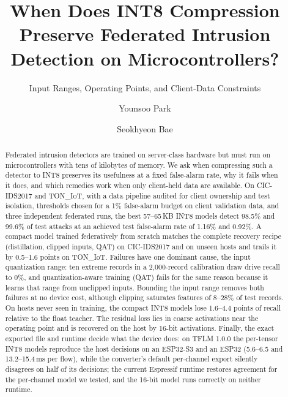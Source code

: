 \documentclass[sigplan,10pt,review,anonymous,nonacm]{acmart}
\newcommand{\cic}{CIC-IDS2017\xspace}
\newcommand{\ton}{TON\_IoT\xspace}
\begin{document}
\title[When Does INT8 Compression Preserve Federated IDS?]{When Does INT8 Compression Preserve Federated Intrusion Detection on Microcontrollers?}
\subtitle{Input Ranges, Operating Points, and Client-Data Constraints}

\author{Younsoo Park}
\author{Seokhyeon Bae}

\begin{abstract}
Federated intrusion detectors are trained on server-class hardware but must run on microcontrollers
with tens of kilobytes of memory. We ask when compressing such a detector to INT8 preserves its
usefulness at a fixed false-alarm rate, why it fails when it does, and which remedies work when only
client-held data are available. On \cic and \ton, with a data pipeline audited for client ownership
and test isolation, thresholds chosen for a 1\% false-alarm budget on client validation data, and
three independent federated runs, the best 57--65\,KB INT8 models detect 98.5\% and 99.6\% of test
attacks at an achieved test false-alarm rate of 1.16\% and 0.92\%. A compact model trained federatively
from scratch matches the complete recovery recipe (distillation, clipped inputs, QAT) on \cic and on
unseen hosts and trails it by 0.5--1.6 points on \ton. Failures have one dominant cause, the input
quantization range: ten extreme records in a 2,000-record calibration draw drive recall to 0\%, and
quantization-aware training (QAT) fails for the same reason because it learns that range from
unclipped inputs. Bounding the input range removes both failures at no device cost, although clipping
saturates features of 8--28\% of test records. On hosts never seen in training, the compact INT8 models
lose 1.6--4.4 points of recall relative to the float teacher. The residual loss lies in coarse
activations near the operating point and is recovered on the host by 16-bit activations. Finally, the
exact exported file and runtime decide what the device does: on TFLM 1.0.0 the per-tensor INT8 models
reproduce the host decisions on an ESP32-S3 and an ESP32 (5.6--6.5 and 13.2--15.4\,ms per flow), while
the converter's default per-channel export silently disagrees on half of its decisions; the current
Espressif runtime restores agreement for the per-channel model we tested, and the 16-bit model runs
correctly on neither runtime.
\end{abstract}

\end{document}
